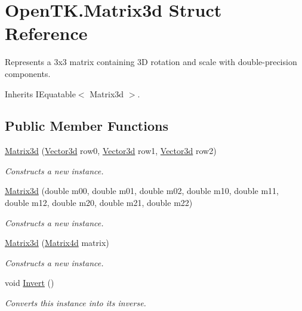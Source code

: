 \hypertarget{struct_open_t_k_1_1_matrix3d}{\section{Open\-T\-K.\-Matrix3d Struct Reference}
\label{struct_open_t_k_1_1_matrix3d}
}


Represents a 3x3 matrix containing 3\-D rotation and scale with double-\/precision components.  




Inherits I\-Equatable$<$ Matrix3d $>$.

\subsection*{Public Member Functions}
\begin{DoxyCompactItemize}
\item 
\hyperlink{struct_open_t_k_1_1_matrix3d_aa05913c4c05dbc7976421af9d8c5c9f4}{Matrix3d} (\hyperlink{struct_open_t_k_1_1_vector3d}{Vector3d} row0, \hyperlink{struct_open_t_k_1_1_vector3d}{Vector3d} row1, \hyperlink{struct_open_t_k_1_1_vector3d}{Vector3d} row2)
\begin{DoxyCompactList}\small\item\em Constructs a new instance. \end{DoxyCompactList}\item 
\hyperlink{struct_open_t_k_1_1_matrix3d_ac02323d65b0cfec8dc5eadaba37a0249}{Matrix3d} (double m00, double m01, double m02, double m10, double m11, double m12, double m20, double m21, double m22)
\begin{DoxyCompactList}\small\item\em Constructs a new instance. \end{DoxyCompactList}\item 
\hyperlink{struct_open_t_k_1_1_matrix3d_ae4522727843f58f3bcab526cef314c6f}{Matrix3d} (\hyperlink{struct_open_t_k_1_1_matrix4d}{Matrix4d} matrix)
\begin{DoxyCompactList}\small\item\em Constructs a new instance. \end{DoxyCompactList}\item 
void \hyperlink{struct_open_t_k_1_1_matrix3d_a64e9a6c1b87956c1b28423b1e152a54f}{Invert} ()
\begin{DoxyCompactList}\small\item\em Converts this instance into its inverse. \end{DoxyCompactList}\item 

\end{DoxyCompactItemize}
